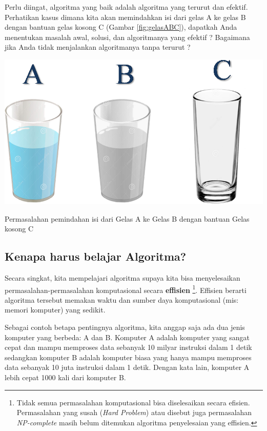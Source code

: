 Perlu diingat, algoritma yang baik adalah algoritma yang terurut dan efektif.  Perhatikan kasus  dimana kita akan memindahkan isi dari gelas A ke gelas B dengan bantuan gelas kosong C (Gambar \ref{fig:gelasABC}), dapatkah Anda menentukan masalah awal, solusi, dan algoritmanya yang efektif ? Bagaimana jika Anda tidak menjalankan algoritmanya tanpa terurut ? 


\begin{marginfigure}[3cm]
	\includegraphics[scale=0.5]{fig/1/Gambar9.png}	
	\caption{Permasalahan pemindahan isi dari Gelas A ke Gelas B dengan bantuan Gelas kosong C}
	\label{fig:gelasABC}
\end{marginfigure}



\subsection{Kenapa harus belajar Algoritma?}
Secara singkat, kita mempelajari algoritma supaya kita bisa menyelesaikan permasalahan-permasalahan komputasional secara \textbf{effisien} \footnote[4.5cm]{Tidak semua permasalahan komputasional bisa diselesaikan secara efisien. Permasalahan yang susah (\textit{Hard Problem}) atau disebut juga permasalahan \textit{NP-complete} masih belum ditemukan algoritma penyelesaian yang effisien.}. Effisien berarti algoritma tersebut memakan waktu dan sumber daya komputasional (mis: memori komputer) yang sedikit. 

Sebagai contoh betapa pentingnya algoritma, kita anggap saja ada dua jenis komputer yang berbeda: A dan B. Komputer A adalah komputer yang sangat cepat dan mampu memproses data sebanyak 10 milyar instruksi dalam 1 detik sedangkan komputer B adalah komputer biasa yang hanya mampu memproses data sebanyak 10 juta instruksi dalam 1 detik. Dengan kata lain, komputer A lebih cepat 1000 kali dari komputer B.

